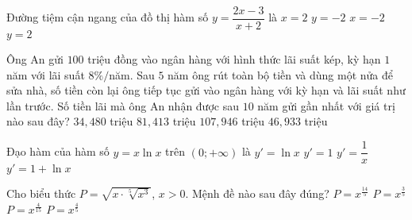 \begin{ex}%
	Đường tiệm cận ngang của đồ thị hàm số $y=\dfrac{2x-3}{x+2}$ là
	\choice
	{$x=2$}
	{$y=-2$}
	{$x=-2$}
	{\True $y=2$}
\end{ex}
\begin{ex}%
	Ông An gửi $100$ triệu đồng vào ngân hàng với hình thức lãi suất kép, kỳ hạn $1$ năm với lãi suất $8\%/$năm. Sau $5$ năm ông rút toàn bộ tiền và dùng một nửa để sửa nhà, số tiền còn lại ông tiếp tục gửi vào ngân hàng với kỳ hạn và lãi suất như lần trước. Số tiền lãi mà ông An nhận được sau $10$ năm gửi gần nhất với giá trị nào sau đây?
	\choice
	{$34{,}480$ triệu}
	{ \True $81{,}413$ triệu}
	{$107{,}946$ triệu}
	{$46{,}933$ triệu}
\end{ex}
\begin{ex}%
	Đạo hàm của hàm số $y=x\ln x$ trên $\left(0;+\infty \right)$ là
	\choice
	{$y'=\ln x$} 
	{ $y'=1$}
	{$y'=\dfrac{1}{x}$}
	{\True $y'=1+\ln x$}
\end{ex}
\begin{ex}%
	Cho biểu thức $P=\sqrt{x\cdot \sqrt[5]{x^3}}$, $x>0.$ Mệnh đề nào sau đây đúng?
	\choice
	{$P={x}^{\tfrac{14}{5}}$}
	{$P={x}^{\tfrac{3}{5}}$}
	{$P={x}^{\tfrac{4}{15}}$}
	{\True $P={x}^{\tfrac{4}{5}}$}
\end{ex}
